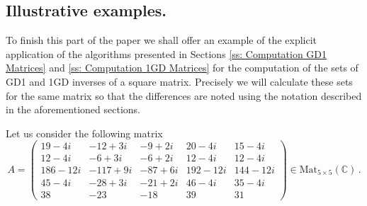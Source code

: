 \documentclass[10pt,a4paper]{amsart}
\theoremstyle{plain}
\theoremstyle{remark}
\numberwithin{equation}{section} \numberwithin{defn}{section}
\begin{document}
\smallskip

\subsection{Illustrative examples.}\label{ss. Examples Algorithms}
 
 To finish this part of the paper we shall offer an example of the explicit application of the algorithms presented in Sections \ref{ss: Computation GD1 Matrices} and \ref{ss: Computation 1GD Matrices} for the computation of the sets of GD1 and 1GD inverses of a square matrix. Precisely we will calculate these sets for the same matrix so that the differences are noted using the notation described in the aforementioned sections.



Let us consider the following matrix $$A = \begin{pmatrix}
19-4i & -12+3i & -9+2i & 20-4i & 15-4i \\
12-4i & -6+3i & -6+2i & 12-4i & 12-4i \\
186-12i & -117+9i & -87+6i & 192-12i & 144-12i \\
45-4i & -28+3i & -21+2i & 46-4i & 35-4i \\
38 & -23 & -18 & 39 & 31
\end{pmatrix} \in \text{Mat}_{5\times 5} ({\mathbb C})\, .$$
\end{document}
